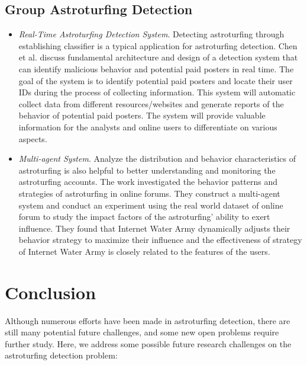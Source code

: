 \documentclass[lettersize,journal]{IEEEtran}
\begin{document}
\subsection{Group Astroturfing Detection}
\begin{itemize}
	\item \emph{Real-Time Astroturfing Detection System}.
Detecting astroturfing through establishing classifier is a typical application for astroturfing detection. Chen et al. \cite{Chen2013BattlingTI} discuss fundamental architecture and design of a detection system that can identify malicious behavior and potential paid posters in real time. The goal of the system is to identify potential paid posters and locate their user IDs during the process of collecting information. This system will automatic collect data from different resources/websites and generate reports of the behavior of potential paid posters. The system will provide valuable information for the analysts and online users to differentiate on various aspects.
	
	\item \emph{Multi-agent System}.
Analyze the distribution and behavior characteristics of astroturfing is also helpful to better understanding and monitoring the astroturfing accounts. The work investigated the behavior patterns and strategies of astroturfing in online forums\cite{Zeng2014Behavior}. They construct a multi-agent system and conduct an experiment using the real world dataset of online forum to study the impact factors of the astroturfing' ability to exert influence. They found that Internet Water Army dynamically adjusts their behavior strategy to maximize their influence and the effectiveness of strategy of Internet Water Army is closely related to the features of the users.
	
\end{itemize}


\section{Conclusion}
Although numerous efforts have been made in astroturfing detection, there are still many potential future challenges, and some new open problems require further study. Here, we address some possible future research challenges on the astroturfing detection problem:
\end{document}
